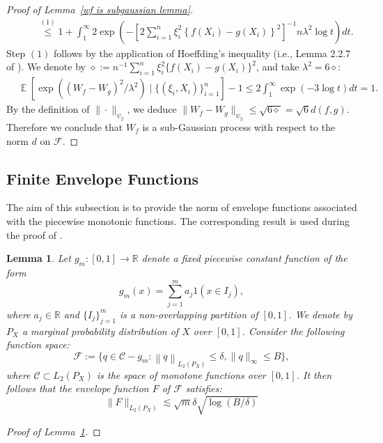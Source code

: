 \documentclass[12pt]{article}
\DeclareMathOperator*{\E}{\mathbb{E}}
\newtheorem{lemma}[theorem]{Lemma}
\begin{document}
\begin{appendices}
\begin{proof}[Proof of Lemma~\ref{wf is subgaussian lemma}]
\begin{equation}
\begin{aligned}
    &\qquad\stackrel{(1)}{\leq} 1 + \int_1^\infty 2 \exp\left(-\left[2\sum_{i=1}^n \xi_i^2 \left\{f(X_i) - g(X_i)\right\}^2\right]^{-1} n\lambda^2 \log t\right) dt.
    \end{aligned}
\end{equation}
Step $(1)$ follows by the application of Hoeffding's inequality (i.e., Lemma 2.2.7 of \cite{van1996weak}). We denote by $\diamond := n^{-1}\sum_{i=1}^n \xi_i^2 \{f(X_i) - g(X_i)\}^2$, and take $\lambda^2 = 6\diamond$:
\begin{equation}\nonumber
    \begin{aligned}
    &\E[\exp((W_f - W_g)^2/\lambda^2)\mid \{(\xi_i,X_i)\}_{i=1}^n] -1\leq 2\int_1^\infty \exp(-3\log t) dt   = 1.
    \end{aligned}
\end{equation}
By the definition of $\|\cdot\|_{\psi_2}$, we deduce $\|W_f - W_g\|_{\psi_2} \leq \sqrt{6\diamond} = \sqrt{6}d(f,g)$. Therefore we conclude that $W_f$ is a sub-Gaussian process with respect to the norm $d$ on $\mathcal{F}$.
\end{proof}


\subsection{Finite Envelope Functions} \label{supp:envelope}
The aim of this subsection is to provide the norm of envelope functions associated with the piecewise monotonic functions. The corresponding result is used during the proof of .
\begin{lemma}
\label{local envelope lemma}
Let $g_m:[0,1]\rightarrow\mathbb{R}$ denote a fixed piecewise constant function of the form
\begin{equation}
    g_m(x) = \sum_{j=1}^m a_j 1(x\in I_j),\nonumber
\end{equation}
where $a_j\in \mathbb{R}$ and $\{I_j\}_{j=1}^m$ is a non-overlapping partition of $[0,1]$. We denote by $P_X$ a marginal probability distribution of $X$ over $[0,1]$. Consider the following function space:
\begin{equation}
    \mathcal{F} := \{q\in \mathcal{C} - g_m :\left\|q\right\|_{L_2(P_X)} \leq \delta, 
\|q\|_{\infty} \leq B\},\nonumber
\end{equation}
where $\mathcal{C}\subset L_2(P_X)$ is the space of monotone functions over $[0,1]$. It then follows that the envelope function $F$ of $\mathcal{F}$ satisfies:
\begin{equation}
    \|F\|_{L_2(P_X)} \lesssim \sqrt{m} \delta \sqrt{\log(B/\delta)}\nonumber
\end{equation}
\end{lemma}
\begin{proof}[Proof of Lemma~\ref{local envelope lemma}]


\end{proof}
\end{appendices}
\end{document}
